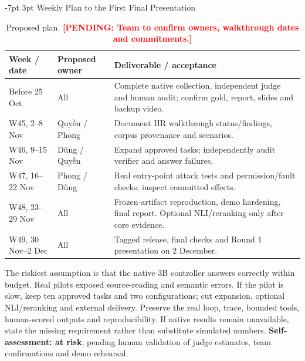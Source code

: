 \documentclass[a4paper,11pt]{article}
\makeatletter
\renewcommand\section{\@startsection{section}{1}{\z@}%
                                   {-7pt \@plus -1pt \@minus -1pt}%
                                   {3pt \@plus 1pt \@minus 1pt}%
                                   {\normalfont\large\bfseries}}
\newcommand{\pending}[1]{\textcolor{red}{\textbf{[PENDING: #1]}}}
\makeatother
\begin{document}
\section{Weekly Plan to the First Final Presentation}
\begin{table}[H]\centering\footnotesize
\begin{tabularx}{\textwidth}{@{}L{1.7cm}L{2.0cm}X@{}}
\toprule Week / date & Proposed owner & Deliverable / acceptance\\\midrule
Before 25 Oct & All & Complete native collection, independent judge and human audit; confirm gold, report, slides and backup video.\\
W45, 2--8 Nov & Quyền / Phong & Document HR walkthrough status/findings, corpus provenance and scenarios.\\
W46, 9--15 Nov & Dũng / Quyền & Expand approved tasks; independently audit verifier and answer failures.\\
W47, 16--22 Nov & Phong / Dũng & Real entry-point attack tests and permission/fault checks; inspect committed effects.\\
W48, 23--29 Nov & All & Frozen-artifact reproduction, demo hardening, final report. Optional NLI/reranking only after core evidence.\\
W49, 30 Nov--2 Dec & All & Tagged release, final checks and Round 1 presentation on 2 December.\\
\bottomrule\end{tabularx}
\caption{Proposed plan. \pending{Team to confirm owners, walkthrough dates and commitments.}}
\end{table}
The riskiest assumption is that the native 3B controller answers correctly within budget. Real pilots exposed source-reading and semantic errors. If the pilot is slow, keep ten approved tasks and two configurations; cut expansion, optional NLI/reranking and external delivery. Preserve the real loop, trace, bounded tools, human-scored outputs and reproducibility. If native results remain unavailable, state the missing requirement rather than substitute simulated numbers.
\textbf{Self-assessment: at risk}, pending human validation of judge estimates, team confirmations and demo rehearsal.

\clearpage
\end{document}

